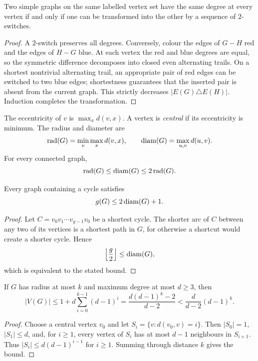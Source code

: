 \begin{notetheorem}
Two simple graphs on the same labelled vertex set have the same degree at every vertex if and only if one can be transformed into the other by a sequence of $2$-switches.
\end{notetheorem}
\begin{proof}
A $2$-switch preserves all degrees.  Conversely, colour the edges of $G-H$ red and the edges of $H-G$ blue.  At each vertex the red and blue degrees are equal, so the symmetric difference decomposes into closed even alternating trails.  On a shortest nontrivial alternating trail, an appropriate pair of red edges can be switched to two blue edges; shortestness guarantees that the inserted pair is absent from the current graph.  This strictly decreases $|E(G)\triangle E(H)|$.  Induction completes the transformation.
\end{proof}
\begin{notedefinition}
The eccentricity of $v$ is $\max_x d(v,x)$.  A vertex is \emph{central} if its eccentricity is minimum.  The radius and diameter are
\[
  \operatorname{rad}(G)=\min_v\max_x d(v,x),
  \qquad
  \operatorname{diam}(G)=\max_{u,v}d(u,v).
\]
For every connected graph,
\[
  \operatorname{rad}(G)\le\operatorname{diam}(G)\le2\operatorname{rad}(G).
\]
\end{notedefinition}

\begin{noteproposition}
Every graph containing a cycle satisfies
\[
  g(G)\le2\operatorname{diam}(G)+1.
\]
\end{noteproposition}
\begin{proof}
Let $C=v_0v_1\cdots v_{g-1}v_0$ be a shortest cycle.  The shorter arc of $C$ between any two of its vertices is a shortest path in $G$, for otherwise a shortcut would create a shorter cycle.  Hence
\[
  \left\lfloor\frac g2\right\rfloor\le\operatorname{diam}(G),
\]
which is equivalent to the stated bound.
\end{proof}

\begin{noteproposition}
If $G$ has radius at most $k$ and maximum degree at most $d\ge3$, then
\[
 |V(G)|\le 1+d\sum_{i=0}^{k-1}(d-1)^i
 =\frac{d(d-1)^k-2}{d-2}
 <\frac d{d-2}(d-1)^k.
\]
\end{noteproposition}
\begin{proof}
Choose a central vertex $v_0$ and let $S_i=\{v:d(v_0,v)=i\}$.  Then $|S_0|=1$, $|S_1|\le d$, and, for $i\ge1$, every vertex of $S_i$ has at most $d-1$ neighbours in $S_{i+1}$.  Thus $|S_i|\le d(d-1)^{i-1}$ for $i\ge1$.  Summing through distance $k$ gives the bound.
\end{proof}
